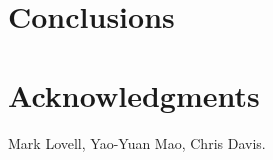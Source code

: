 \documentclass[aps,prl,10pt,twocolumn,superscriptaddress,showpacs]{revtex4-1}
\begin{document}


\section{Conclusions}
\label{sec:conclusions}

 
\vspace{-0.5 cm}
	

\section*{Acknowledgments} 

Mark Lovell, Yao-Yuan Mao, Chris Davis.


\newcommand{\mnras}[0]{M.N.R.A.S.}

%	
	
\end{document}
